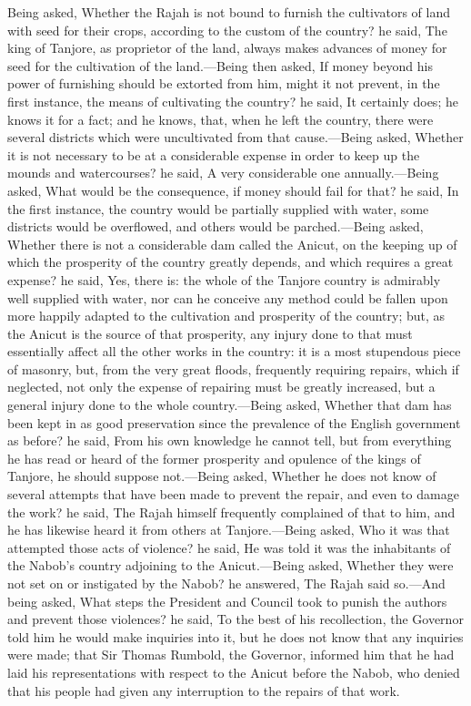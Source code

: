 Being asked, Whether the Rajah is not bound to furnish the cultivators of land with seed for their crops, according to the custom of the country? he said, The king of Tanjore, as proprietor of the land, always makes advances of money for seed for the cultivation of the land.—Being then asked, If money beyond his power of furnishing should be extorted from him, might it not prevent, in the first instance, the means of cultivating the country? he said, It certainly does; he knows it for a fact; and he knows, that, when he left the country, there were several districts which were uncultivated from that cause.—Being asked, Whether it is not necessary to be at a considerable expense in order to keep up the mounds and watercourses? he said, A very considerable one annually.—Being asked, What would be the consequence, if money should fail for that? he said, In the first instance, the country would be partially supplied with water, some districts would be overflowed, and others would be parched.—Being asked, Whether there is not a considerable dam called the Anicut, on the keeping up of which the prosperity of the country greatly depends, and which requires a great expense? he said, Yes, there is: the whole of the Tanjore country is admirably well supplied with water, nor can he conceive any method could be fallen upon more happily adapted to the cultivation and prosperity of the country; but, as the Anicut is the source of that prosperity, any injury done to that must essentially affect all the other works in the country: it is a most stupendous piece of masonry, but, from the very great floods, frequently requiring repairs, which if neglected, not only the expense of repairing must be greatly increased, but a general injury done to the whole country.—Being asked, Whether that dam has been kept in as good preservation since the prevalence of the English government as before? he said, From his own knowledge he cannot tell, but from everything he has read or heard of the former prosperity and opulence of the kings of Tanjore, he should suppose not.—Being asked, Whether he does not know of several attempts that have been made to prevent the repair, and even to damage the work? he said, The Rajah himself frequently complained of that to him, and he has likewise heard it from others at Tanjore.—Being asked, Who it was that attempted those acts of violence? he said, He was told it was the inhabitants of the Nabob's country adjoining to the Anicut.—Being asked, Whether they were not set on or instigated by the Nabob? he answered, The Rajah said so.—And being asked, What steps the President and Council took to punish the authors and prevent those violences? he said, To the best of his recollection, the Governor told him he would make inquiries into it, but he does not know that any inquiries were made; that Sir Thomas Rumbold, the Governor, informed him that he had laid his representations with respect to the Anicut before the Nabob, who denied that his people had given any interruption to the repairs of that work.

